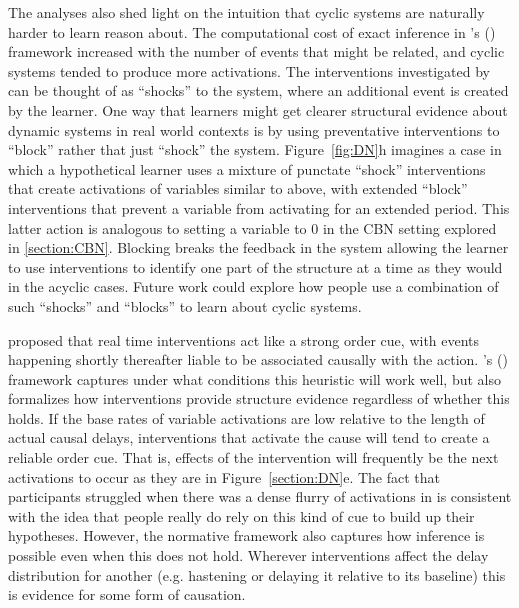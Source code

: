\documentclass{cambridge7A}%
\def\citeapos#1{\citeauthor{#1}'s (\citeyear{#1})}
\begin{document}
The analyses also shed light on the intuition that cyclic systems are naturally harder to learn reason about. The computational cost of exact inference in \citeapos{bramley2018time} framework increased with the number of events that might be related, and cyclic systems tended to produce more activations.  The interventions investigated by \cite{bramley2017dynamic} can be thought of as ``shocks'' to the system, where an additional event is created by the learner.  One way that learners might get clearer structural evidence about dynamic systems in real world contexts is by using preventative interventions to ``block'' rather that just ``shock'' the system.  Figure~\ref{fig:DN}h imagines a case in which a hypothetical learner uses a mixture of punctate ``shock'' interventions that create activations of variables similar to above, with extended ``block'' interventions that prevent a variable from activating for an extended period.  This latter action is analogous to setting a variable to 0 in the CBN setting explored in \ref{section:CBN}.  %
Blocking breaks the feedback in the system allowing the learner to use interventions to identify one part of the structure at a time as they would in the acyclic cases.  Future work could explore how people use a combination of such ``shocks'' and ``blocks'' to learn about cyclic systems.

\cite{lagnado2004advantage} proposed that real time interventions act like a strong order cue, with events happening shortly thereafter liable to be associated causally with the action.  \citeapos{bramley2018time} framework captures under what conditions this heuristic will work well, but also formalizes how interventions provide structure evidence regardless of whether this holds.  If the base rates of variable activations are low relative to the length of actual causal delays, interventions that activate the cause will tend to create a reliable order cue.  That is, effects of the intervention will frequently be the next activations to occur as they are in Figure~\ref{section:DN}e.  The fact that participants struggled when there was a dense flurry of activations in \cite{bramley2017dynamic} is consistent with the idea that people really do rely on this kind of cue to build up their hypotheses.  
However, the normative framework also captures how inference is possible even when this does not hold.  Wherever interventions affect the delay distribution for another (e.g. hastening or delaying it relative to its baseline) this is evidence for some form of causation.
\end{document}
